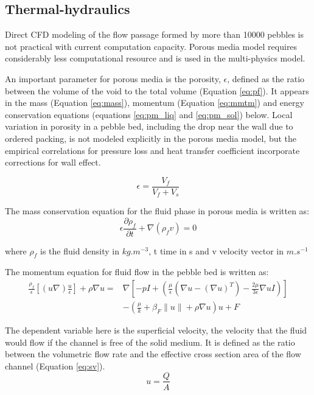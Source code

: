 \documentclass{elsarticle}
\begin{document}
\subsection{Thermal-hydraulics}
Direct CFD modeling of the flow passage formed by more than 10000 pebbles is not practical with current computation capacity. Porous media model requires considerably less computational resource and is used in the multi-physics model.

An important parameter for porous media is the porosity, $\epsilon$, defined as the ratio between the volume of the void to the total volume (Equation \ref{eq:pf}). It appears in the mass (Equation \ref{eq:mass}), momentum (Equation \ref{eq:mmtm}) and energy conservation equations (equations \ref{eq:pm_liq} and \ref{eq:pm_sol}) below. Local variation in porosity in a pebble bed, including the drop near the wall due to ordered packing, is not modeled explicitly in the porous media model, but the empirical correlations for pressure loss and heat transfer coefficient incorporate corrections for wall effect.


\begin{equation}
  \epsilon = \frac{V_f}{V_f+V_s}
  \label{eq:pf}
\end{equation}

The mass conservation equation for the fluid phase in porous media is written as:
\begin{equation}
  \epsilon\frac{\partial \rho_f}{\partial t} + \nabla(\rho_fv) = 0
  \label{eq:mass}
\end{equation}

where $\rho_f$ is the fluid density in $kg.m^{-3}$, t time in s and v velocity vector in $m.s^{-1}$

The momentum equation for fluid flow in the pebble bed is written as:
\begin{align}
  \frac{\rho_f}{\epsilon} \left[(u\nabla)\frac{u}{\epsilon} \right] + \rho\nabla u = &\nabla \left[ -pI + (\frac{\mu}{\epsilon}(\nabla u - (\nabla u)^T) - \frac{2\mu}{3\epsilon} \nabla u I)\right]  \nonumber\\
  &- (\frac{\mu}{k} + \beta_F \|u\| + \rho\nabla u) u + F
  \label{eq:mmtm}
\end{align}

The dependent variable here is the superficial velocity, the velocity that the fluid would flow if the channel is free of the solid medium. It is defined as the ratio between the volumetric flow rate and the effective cross section area of the flow channel (Equation \ref{eq:sv}).
\begin{equation}
  u=\frac{Q}{A}
  \label{eq:sv}
\end{equation}
\end{document}
